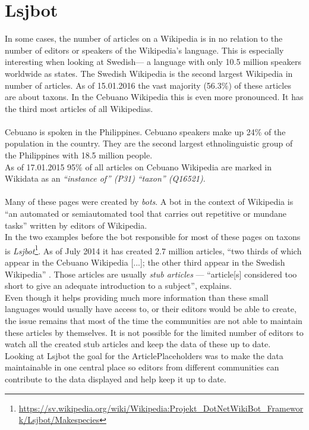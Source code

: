 \section{Lsjbot}
In some cases, the number of articles on a Wikipedia is in no relation to the number of editors or speakers of the Wikipedia's language. This is especially interesting when looking at Swedish--- a language with only 10.5 million speakers worldwide as \citet{nlpd:01} states. The Swedish Wikipedia is the second largest Wikipedia in number of articles. As of 15.01.2016 the vast majority (56.3\%) of these articles are about taxons.
In the Cebuano Wikipedia this is even more pronounced. It has the third most articles of all Wikipedias. \citep{wiki:07} \\
\\
Cebuano is spoken in the Philippines. Cebuano speakers make up 24\% of the population in the country. \citep{cebuano:01} They are the second largest ethnolinguistic group of the Philippines with 18.5 million people. \citep{cebuano:02} \\
As of 17.01.2015 95\% of all articles on Cebuano Wikipedia are marked in Wikidata as an \textit{``instance of'' (P31)} \textit{``taxon'' (Q16521)}. \citep{wiki:07} \\
\\
Many of these pages were created by \textit{bots}. A bot in the context of Wikipedia is ``an automated or semiautomated tool that carries out repetitive or mundane tasks'' \citep{wiki:08} written by editors of Wikipedia. \\
In the two examples before the bot responsible for most of these pages on taxons is \textit{Lsjbot}\footnote{\url{https://sv.wikipedia.org/wiki/Wikipedia:Projekt_DotNetWikiBot_Framework/Lsjbot/Makespecies}}. As of July 2014 it has created 2.7 million articles, ``two thirds of which appear in the Cebuano Wikipedia [...]; the other third appear in the Swedish Wikipedia'' \citep{wiki:09}. Those articles are usually \textit{stub articles} --- ``article[s] considered too short to give an adequate introduction to a subject'', \citet{stubs} explains. \\
Even though it helps providing much more information than these small languages would usually have access to, or their editors would be able to create, the issue remains that most of the time the communities are not able to maintain these articles by themselves. It is not possible for the limited number of editors to watch all the created stub articles and keep the data of these up to date. \\
Looking at Lsjbot the goal for the ArticlePlaceholders was to make the data maintainable in one central place so editors from different communities can contribute to the data displayed and help keep it up to date.

